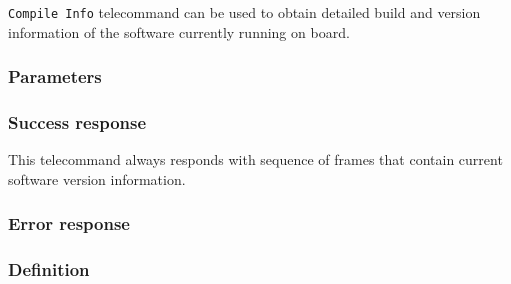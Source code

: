\texttt{Compile Info} telecommand can be used to obtain detailed build and version information of the software currently running on board.

\subsubsection{Parameters}
\None

\subsubsection{Success response}
This telecommand always responds with sequence of  frames that contain current \OBC software version information.

\subsubsection{Error response}
\None

\subsubsection{Definition}


